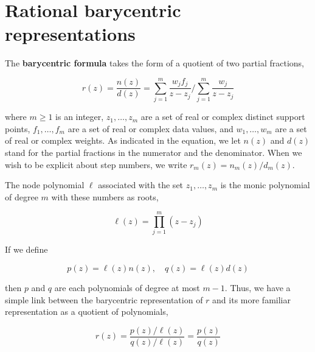 \documentclass[11pt]{article}
\theoremstyle{definition}
\begin{document}
    \section{Rational barycentric representations} 
    The \textbf{barycentric formula} takes the form of a quotient of two partial fractions,
    
    
    \begin{equation*}
    r(z)=\frac{n(z)}{d(z)}=\sum_{j=1}^{m} \frac{w_{j} f_{j}}{z-z_{j}} / \sum_{j=1}^{m} \frac{w_{j}}{z-z_{j}} \tag{2.1}
    \end{equation*}
    
    
    where $m \geq 1$ is an integer, $z_{1}, \ldots, z_{m}$ are a set of real or complex distinct support points, $f_{1}, \ldots, f_{m}$ are a set of real or complex data values, and $w_{1}, \ldots, w_{m}$ are a set of real or complex weights. As indicated in the equation, we let $n(z)$ and $d(z)$ stand for the partial fractions in the numerator and the denominator. When we wish to be explicit about step numbers, we write $r_{m}(z)=n_{m}(z) / d_{m}(z)$.
    
    The node polynomial $\ell$ associated with the set $z_{1}, \ldots, z_{m}$ is the monic polynomial of degree $m$ with these numbers as roots,
    
    
    \begin{equation*}
    \ell(z)=\prod_{j=1}^{m}\left(z-z_{j}\right) \tag{2.2}
    \end{equation*}
    
    
    If we define
    
    
    \begin{equation*}
    p(z)=\ell(z) n(z), \quad q(z)=\ell(z) d(z) \tag{2.3}
    \end{equation*}
    
    
    then $p$ and $q$ are each polynomials of degree at most $m-1$. Thus, we have a simple link between the barycentric representation of $r$ and its more familiar representation as a quotient of polynomials,
    
    
    \begin{equation*}
    r(z)=\frac{p(z) / \ell(z)}{q(z) / \ell(z)}=\frac{p(z)}{q(z)} \tag{2.4}
    \end{equation*}
    
\end{document}
